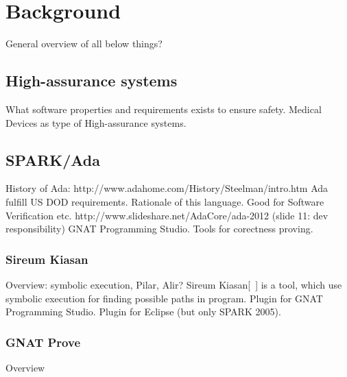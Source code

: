 
\cleardoublepage


\chapter{Background}
\label{background}

General overview of all below things?

\section{High-assurance systems}
\label{background:highas}
What software properties and requirements exists to ensure safety.
Medical Devices as type of High-assurance systems.


\section{SPARK/Ada}
\label{background:spark}
History of Ada: http://www.adahome.com/History/Steelman/intro.htm 
Ada fulfill US DOD requirements.
Rationale of this language. Good for Software Verification etc.
http://www.slideshare.net/AdaCore/ada-2012 (slide 11: dev responsibility)
GNAT Programming Studio.
Tools for corectness proving.

\subsection{Sireum Kiasan}
\label{background:spark:sireum}
Overview: symbolic execution, Pilar, Alir?
Sireum Kiasan[~\cite{Sireum:RobbyICSE13,Sireum:Kiasan1,Sireum:Kiasan2}] is a tool, which use symbolic execution for finding possible paths in program.
Plugin for GNAT Programming Studio.
Plugin for Eclipse (but only SPARK 2005).

\subsection{GNAT Prove}
\label{background:spark:gnatprove}
Overview

